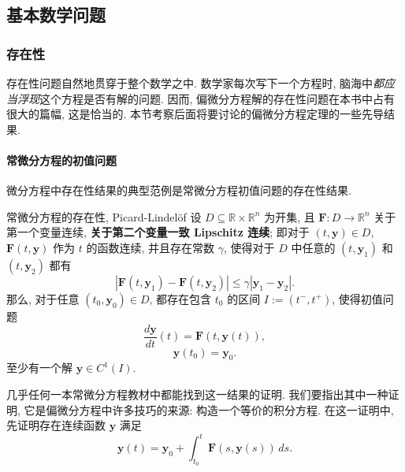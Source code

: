 \subsection{基本数学问题}\label{sec:basic-mathematical-questions}

\subsubsection{存在性}\label{subsec:existence}

存在性问题自然地贯穿于整个数学之中. 数学家每次写下一个方程时, 脑海中\emph{都应当浮现}这个方程是否有解的问题. 因而, 偏微分方程解的存在性问题在本书中占有很大的篇幅, 这是恰当的. 本节考察后面将要讨论的偏微分方程定理的一些先导结果.

\paragraph*{常微分方程的初值问题}

微分方程中存在性结果的典型范例是常微分方程初值问题的存在性结果.

\begin{Theorem}{常微分方程的存在性, Picard-Lindelöf}
\label{thm:ode-existence}
设 $D\subseteq\mathbb{R}\times\mathbb{R}^n$ 为开集, 且 $\mathbf{F}:D\to\mathbb{R}^n$ 关于第一个变量连续, \textbf{关于第二个变量一致 Lipschitz 连续}; 即对于 $(t,\mathbf{y})\in D$, $\mathbf{F}(t,\mathbf{y})$ 作为 $t$ 的函数连续, 并且存在常数 $\gamma$, 使得对于 $D$ 中任意的 $(t,\mathbf{y}_1)$ 和 $(t,\mathbf{y}_2)$ 都有
\begin{equation}\label{eq:uniform-lipschitz-bound}
|\mathbf{F}(t,\mathbf{y}_1)-\mathbf{F}(t,\mathbf{y}_2)|\leq\gamma|\mathbf{y}_1-\mathbf{y}_2|.
\end{equation}
那么, 对于任意 $(t_0,\mathbf{y}_0)\in D$, 都存在包含 $t_0$ 的区间 $I:=(t^-,t^+)$, 使得初值问题
\begin{equation}\label{eq:ode-initial-value-dynamics}
\frac{d\mathbf{y}}{dt}(t)=\mathbf{F}(t,\mathbf{y}(t)),
\end{equation}
\begin{equation}\label{eq:ode-initial-value-data}
\mathbf{y}(t_0)=\mathbf{y}_0.
\end{equation}
至少有一个解 $\mathbf{y}\in C^1(I)$.
\end{Theorem}

几乎任何一本常微分方程教材中都能找到这一结果的证明. 我们要指出其中一种证明, 它是偏微分方程中许多技巧的来源: 构造一个等价的积分方程. 在这一证明中, 先证明存在连续函数 $\mathbf{y}$ 满足
\begin{equation}\label{eq:ode-integral-equation}
\mathbf{y}(t)=\mathbf{y}_0+\int_{t_0}^t\mathbf{F}(s,\mathbf{y}(s))\,ds.
\end{equation}

